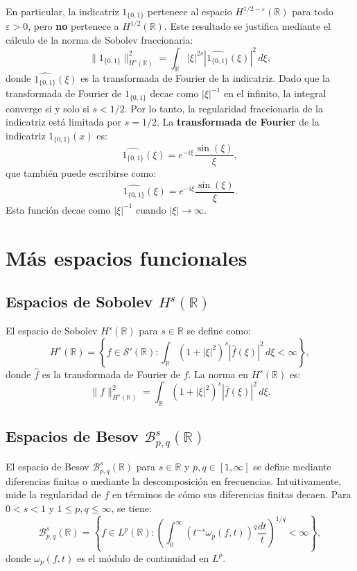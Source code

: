 \documentclass[12pt]{book}
\newcommand{\bes}{\mathcal{B}}
\newcommand{\R}{\mathbb{R}}
\theoremstyle{definition}
\theoremstyle{plain}
\theoremstyle{remark}
\begin{document}
En particular, la indicatriz $\mathrm{1}_{\{0,1\}}$ pertenece al espacio $H^{1/2 - \varepsilon}(\mathbb{R})$ para todo $\varepsilon > 0$, pero \textbf{no} pertenece a $H^{1/2}(\mathbb{R})$. Este resultado se justifica mediante el cálculo de la norma de Sobolev fraccionaria:
\[
\| \mathrm{1}_{\{0,1\}} \|_{H^s(\mathbb{R})}^2
= \int_{\mathbb{R}} |\xi|^{2s} |\widehat{\mathrm{1}_{\{0,1\}}}(\xi)|^2 \, d\xi,
\]
donde $\widehat{\mathrm{1}_{\{0,1\}}}(\xi)$ es la transformada de Fourier de la indicatriz. Dado que la transformada de Fourier de $\mathrm{1}_{\{0,1\}}$ decae como $|\xi|^{-1}$ en el infinito, la integral converge si y solo si $s < 1/2$. Por lo tanto, la regularidad fraccionaria de la indicatriz está limitada por $s = 1/2$.
La \textbf{transformada de Fourier} de la indicatriz \(\mathrm{1}_{\{0,1\}}(x)\) es:
\[
\widehat{\mathrm{1}_{\{0,1\}}}(\xi) = e^{-i\xi} \frac{\sin(\xi)}{\xi},
\]
que también puede escribirse como:
\[
\widehat{1_{\{0,1\}}}(\xi) = e^{-i\xi} \frac{\sin(\xi)}{\xi}.
\]
Esta función decae como \(|\xi|^{-1}\) cuando \(|\xi| \to \infty\).

\section{M\'as espacios funcionales}

\subsection{Espacios de Sobolev \(H^s(\R)\)}
El espacio de Sobolev \(H^s(\R)\) para \(s \in \mathbb{R}\) se define como:
\[
H^s(\R) = \left\{ f \in \mathcal{S}'(\R) : \int_{\R} (1 + |\xi|^2)^s |\widehat{f}(\xi)|^2 \, d\xi < \infty \right\},
\]
donde \(\widehat{f}\) es la transformada de Fourier de \(f\). La norma en \(H^s(\R)\) es:
\[
\|f\|_{H^s(\R)}^2 = \int_{\R} (1 + |\xi|^2)^s |\widehat{f}(\xi)|^2 \, d\xi.
\]

\subsection{Espacios de Besov \(\bes_{p,q}^s(\R)\)}
El espacio de Besov \(\bes_{p,q}^s(\R)\) para \(s \in \mathbb{R}\) y \(p, q \in [1, \infty]\) se define mediante diferencias finitas o mediante la descomposición en frecuencias. Intuitivamente, mide la regularidad de \(f\) en términos de cómo sus diferencias finitas decaen. Para \(0 < s < 1\) y \(1 \leq p, q \leq \infty\), se tiene:
\[
\bes_{p,q}^s(\R) = \left\{ f \in L^p(\R) : \left( \int_0^\infty \left( t^{-s} \omega_p(f, t) \right)^q \frac{dt}{t} \right)^{1/q} < \infty \right\},
\]
donde \(\omega_p(f, t)\) es el módulo de continuidad en \(L^p\).
\end{document}
